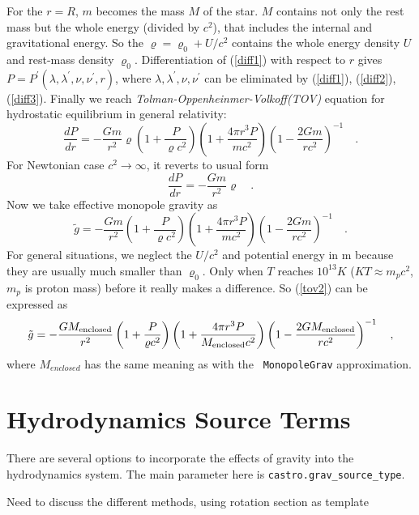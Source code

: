 For the $r = R$, $m$ becomes the mass $M$ of the star. $M$ contains
not only the rest mass but the whole energy (divided by $c^2$), that
includes the internal and gravitational energy. So the $\varrho =
\varrho_0 +U/c^2$ contains the whole energy density $U$ and rest-mass
density $\varrho_0$.  Differentiation of (\ref{diff1}) with respect to
$r$ gives $P = P^{\prime}(\lambda,\lambda^{\prime},
\nu,\nu^{\prime},r)$, where
$\lambda,\lambda^{\prime},\nu,\nu^{\prime}$ can be eliminated by
(\ref{diff1}), (\ref{diff2}), (\ref{diff3}). Finally we reach
\textit{Tolman-Oppenheinmer-Volkoff(TOV)} equation for hydrostatic
equilibrium in general relativity:
\begin{equation}\label{tov}
  \frac{dP}{dr} = -\frac{Gm}{r^{2}}\varrho \left (1+\frac{P}{\varrho
    c^{2}}\right )\left (1+\frac{4\pi r^3 P}{m c^{2}}\right ) \left (1-\frac{2Gm}{r c^{2}} \right)^{-1} \quad .
\end{equation}
For Newtonian case $c^2 \rightarrow  \infty $, it reverts to usual form
\begin{equation}\label{newton}
  \frac{dP}{dr} = -\frac{Gm}{r^{2}}\varrho \quad .
\end{equation}
Now we take effective monopole gravity as
\begin{equation}\label{tov2}
\tilde{g} = -\frac{Gm}{r^{2}} (1+\frac{P}{\varrho
  c^{2}})(1+\frac{4\pi r^3 P}{m c^{2}}) (1-\frac{2Gm}{r c^{2}})^{-1}  \quad .
\end{equation}
For general situations, we neglect the $U/c^2$ and potential energy in
m because they are usually much smaller than $\varrho_0$. Only when
$T$ reaches $10^{13} K$ ($KT \approx m_{p} c^2$, $m_p$ is proton mass)
before it really makes a difference. So (\ref{tov2}) can be expressed
as
\begin{equation}\label{tov3}
  \tilde{g} = -\frac{GM_{\rm enclosed}}{r^{2}} \left (1+\frac{P}{\varrho
    c^{2}} \right )\left (1+\frac{4\pi r^3 P}{M_{\rm enclosed} c^{2}} \right ) \left (1-\frac{2GM_{\rm enclosed}}{r c^{2}} \right )^{-1} \quad ,
\end{equation}
where $M_{enclosed}$ has the same meaning as with the {\tt
  MonopoleGrav} approximation.



\section{Hydrodynamics Source Terms}

There are several options to incorporate the effects of gravity into the 
hydrodynamics system.  The main parameter here is {\tt castro.grav\_source\_type}.

{\color{red} Need to discuss the different methods, using rotation section as template}
